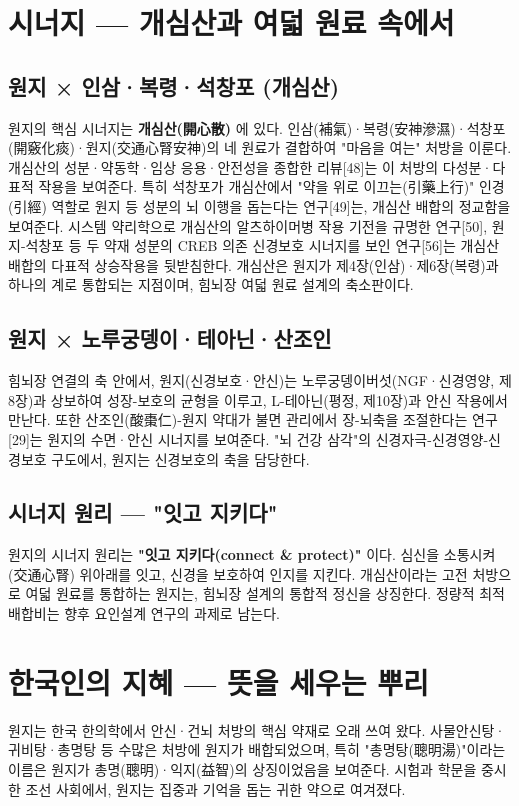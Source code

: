 \documentclass[11pt,oneside]{book}
\begin{document}
\section{시너지 — 개심산과 여덟 원료 속에서}
\subsection{원지 × 인삼·복령·석창포 (개심산)}
원지의 핵심 시너지는 \textbf{개심산(開心散)} 에 있다. 인삼(補氣)·복령(安神滲濕)·석창포(開竅化痰)·원지(交通心腎安神)의 네 원료가 결합하여 "마음을 여는" 처방을 이룬다. 개심산의 성분·약동학·임상 응용·안전성을 종합한 리뷰[48]는 이 처방의 다성분·다표적 작용을 보여준다. 특히 석창포가 개심산에서 "약을 위로 이끄는(引藥上行)" 인경(引經) 역할로 원지 등 성분의 뇌 이행을 돕는다는 연구[49]는, 개심산 배합의 정교함을 보여준다. 시스템 약리학으로 개심산의 알츠하이머병 작용 기전을 규명한 연구[50], 원지-석창포 등 두 약재 성분의 CREB 의존 신경보호 시너지를 보인 연구[56]는 개심산 배합의 다표적 상승작용을 뒷받침한다. 개심산은 원지가 제4장(인삼)·제6장(복령)과 하나의 계로 통합되는 지점이며, 힘뇌장 여덟 원료 설계의 축소판이다.

\subsection{원지 × 노루궁뎅이·테아닌·산조인}
힘뇌장 연결의 축 안에서, 원지(신경보호·안신)는 노루궁뎅이버섯(NGF·신경영양, 제8장)과 상보하여 성장-보호의 균형을 이루고, L-테아닌(평정, 제10장)과 안신 작용에서 만난다. 또한 산조인(酸棗仁)-원지 약대가 불면 관리에서 장-뇌축을 조절한다는 연구[29]는 원지의 수면·안신 시너지를 보여준다. "뇌 건강 삼각"의 신경자극-신경영양-신경보호 구도에서, 원지는 신경보호의 축을 담당한다.

\subsection{시너지 원리 — "잇고 지키다"}
원지의 시너지 원리는 \textbf{"잇고 지키다(connect \& protect)"} 이다. 심신을 소통시켜(交通心腎) 위아래를 잇고, 신경을 보호하여 인지를 지킨다. 개심산이라는 고전 처방으로 여덟 원료를 통합하는 원지는, 힘뇌장 설계의 통합적 정신을 상징한다. 정량적 최적 배합비는 향후 요인설계 연구의 과제로 남는다.

\section{한국인의 지혜 — 뜻을 세우는 뿌리}
원지는 한국 한의학에서 안신·건뇌 처방의 핵심 약재로 오래 쓰여 왔다. 사물안신탕·귀비탕·총명탕 등 수많은 처방에 원지가 배합되었으며, 특히 "총명탕(聰明湯)"이라는 이름은 원지가 총명(聰明)·익지(益智)의 상징이었음을 보여준다. 시험과 학문을 중시한 조선 사회에서, 원지는 집중과 기억을 돕는 귀한 약으로 여겨졌다.
\end{document}
